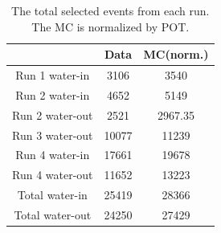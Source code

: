 \begin{table}[h]
\caption{The total selected events from each run. The MC is normalized by POT.}
\centering
\begin{tabular}{ccc} \toprule
 & Data & MC(norm.) \\
\hline
Run 1 water-in & 3106 & 3540 \\ 
Run 2 water-in & 4652 & 5149 \\ 
Run 2 water-out & 2521 & 2967.35 \\ 
Run 3 water-out & 10077 & 11239 \\ 
Run 4 water-in & 17661 & 19678 \\ 
Run 4 water-out & 11652 & 13223 \\ 
\hline
Total water-in & 25419 & 28366\\ 
Total water-out & 24250 & 27429\\ 
\bottomrule
\end{tabular} 
\label{tab:sel}
\end{table}